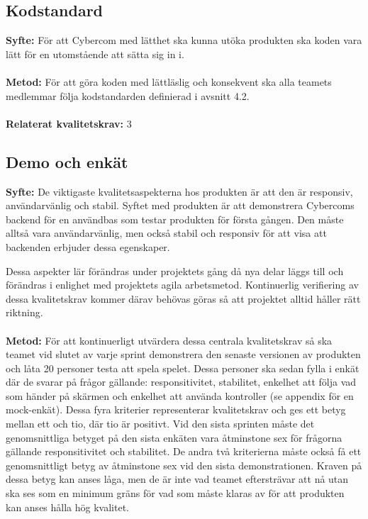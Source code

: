 \documentclass[10pt]{article}
\begin{document}
	\subsection{Kodstandard}
	\textbf{Syfte:} För att Cybercom med lätthet ska kunna utöka produkten ska koden vara lätt för en utomstående att sätta sig in i.
	\\\\
	\textbf{Metod:} För att göra koden med lättläslig och konsekvent ska alla teamets medlemmar följa kodstandarden definierad i avsnitt 4.2.
	\\\\
	\textbf{Relaterat kvalitetskrav:} 3
	\\
	
	\subsection{Demo och enkät}
	\textbf{Syfte:} De viktigaste kvalitetsaspekterna hos produkten är att den är responsiv, användarvänlig och stabil. Syftet med produkten är att demonstrera Cybercoms backend för en användbas som testar produkten för första gången. Den måste alltså vara användarvänlig, men också stabil och responsiv för att visa att backenden erbjuder dessa egenskaper.
	
	Dessa aspekter lär förändras under projektets gång då nya delar läggs till och förändras i enlighet med projektets agila arbetsmetod. Kontinuerlig verifiering av dessa kvalitetskrav kommer därav behövas göras så att projektet alltid håller rätt riktning.
	\\\\
	\textbf{Metod:} För att kontinuerligt utvärdera dessa centrala kvalitetskrav så ska teamet vid slutet av varje sprint demonstrera den senaste versionen av produkten och låta 20 personer testa att spela spelet. Dessa personer ska sedan fylla i enkät där de svarar på frågor gällande: responsitivitet, stabilitet, enkelhet att följa vad som händer på skärmen och enkelhet att använda kontroller (se appendix för en mock-enkät). Dessa fyra kriterier representerar kvalitetskrav och ges ett betyg mellan ett och tio, där tio är positivt. Vid den sista sprinten måste det genomsnittliga betyget på den sista enkäten vara åtminstone sex för frågorna gällande responsitivitet och stabilitet. De andra två kriterierna måste också få ett genomsnittligt betyg av åtminstone sex vid den sista demonstrationen. Kraven på dessa betyg kan anses låga, men de är inte vad teamet eftersträvar att nå utan ska ses som en minimum gräns för vad som måste klaras av för att produkten kan anses hålla hög kvalitet.
	
\end{document}
